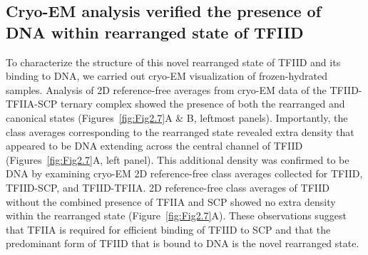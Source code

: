\subsection{Cryo-EM analysis verified the presence of DNA within rearranged state of TFIID}
To characterize the structure of this novel rearranged state of TFIID and its binding to DNA, we carried out cryo-EM visualization of frozen-hydrated samples. Analysis of 2D reference-free averages from cryo-EM data of the TFIID-TFIIA-SCP ternary complex showed the presence of both the rearranged and canonical states (Figures~\ref{fig:Fig2.7}A \& B, leftmost panels). Importantly, the class averages corresponding to the rearranged state revealed extra density that appeared to be DNA extending across the central channel of TFIID (Figures~\ref{fig:Fig2.7}A, left panel). This additional density was confirmed to be DNA by examining cryo-EM 2D reference-free class averages collected for TFIID, TFIID-SCP, and TFIID-TFIIA. 2D reference-free class averages of TFIID without the combined presence of TFIIA and SCP showed no extra density within the rearranged state (Figure~\ref{fig:Fig2.7}A). These observations suggest that TFIIA is required for efficient binding of TFIID to SCP and that the predominant form of TFIID that is bound to DNA is the novel rearranged state.

